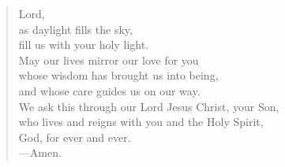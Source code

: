\prayer

\setlength{\leftmargini}{\prayerleftmargini}

\begin{verse}
Lord,\\
as daylight fills the sky,\\
fill us with your holy light.\\
May our lives mirror our love for you\\
whose wisdom has brought us into being,\\
and whose care guides us on our way.\\
We ask this through our Lord Jesus Christ, your Son,\\
who lives and reigns with you and the Holy Spirit,\\
God, for ever and ever.\\
{\color{red}---\thinspace}Amen.
\end{verse}

\setlength{\leftmargini}{\defleftmargini}